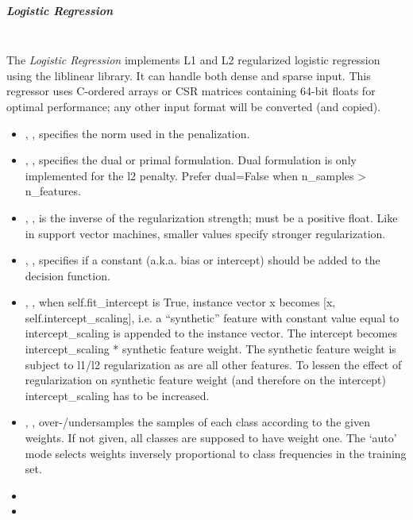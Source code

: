 \subparagraph{Logistic Regression}
\mbox{}
\\The \textit{Logistic Regression} implements L1 and L2 regularized logistic
regression using the liblinear library.
%
It can handle both dense and sparse input.
%
This regressor uses C-ordered arrays or CSR matrices containing 64-bit floats
for optimal performance; any other input format will be converted (and copied).
%
\begin{itemize}
  \item {}, , specifies the norm
  used in the penalization.
  \item {}, , specifies the dual or primal
  formulation.
  Dual formulation is only implemented for the l2 penalty.
  Prefer dual=False when n\_samples > n\_features.
  \item {} , , is the inverse of the
  regularization strength; must be a positive float.
  Like in support vector machines, smaller values specify stronger
  regularization.
  \item {}, , specifies if a constant
  (a.k.a. bias or intercept) should be added to the decision function.
  \item {}, , when
  self.fit\_intercept is True, instance vector x becomes [x,
  self.intercept\_scaling], i.e. a ``synthetic'' feature with constant value
  equal to intercept\_scaling is appended to the instance vector.
  The intercept becomes intercept\_scaling * synthetic feature
  weight.
  \nb The synthetic feature weight is subject to l1/l2 regularization as are all
  other features.
  To lessen the effect of regularization on synthetic feature weight (and
  therefore on the intercept) intercept\_scaling has to be increased.
  \item {}, ,
  over-/undersamples the samples of each class according to the given weights.
  If not given, all classes are supposed to have weight one.
  The `auto' mode selects weights inversely proportional to class frequencies
  in the training set.
  \item {}
  \item \tolDescriptionC{}
\end{itemize}

